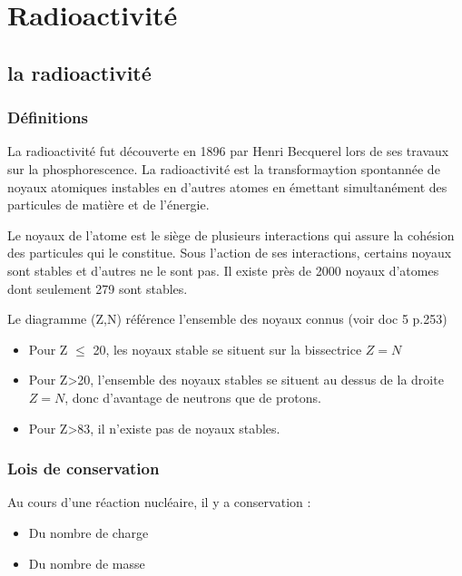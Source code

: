 \chapter{Radioactivité}
\section{la radioactivité}
\subsection{Définitions}
\begin{definition}[Radioactivité]\label{def:Radiactivité}
    La radioactivité fut découverte en 1896 par Henri Becquerel lors de ses travaux sur la phosphorescence. La radioactivité est la transformaytion spontannée de noyaux atomiques instables en d'autres atomes en émettant simultanément des particules de matière et de l'énergie.  \par 
    Le noyaux de l'atome est le siège de plusieurs interactions qui assure la cohésion des particules qui le constitue. Sous l'action de ses interactions, certains noyaux sont stables et d'autres ne le sont pas. Il existe près de 2000 noyaux d'atomes dont seulement 279 sont stables.
\end{definition}

Le diagramme (Z,N) référence l'ensemble des noyaux connus (voir doc 5 p.253)
\begin{itemize}
    \item Pour Z \(\leq\) 20, les noyaux stable se situent sur la bissectrice $Z=N$
    \item Pour Z>20, l'ensemble des noyaux stables se situent au dessus de la droite $Z=N$, donc d'avantage de neutrons que de protons.
    \item Pour Z>83, il n'existe pas de noyaux stables.
\end{itemize}

\subsection{Lois de conservation}

\begin{theorem}[Conservation]\label{thm:consmassecharge}
    Au cours d'une réaction nucléaire, il y a conservation : 
    \begin{itemize}
        \item Du nombre de charge
        \item Du nombre de masse
    \end{itemize}
\end{theorem}

